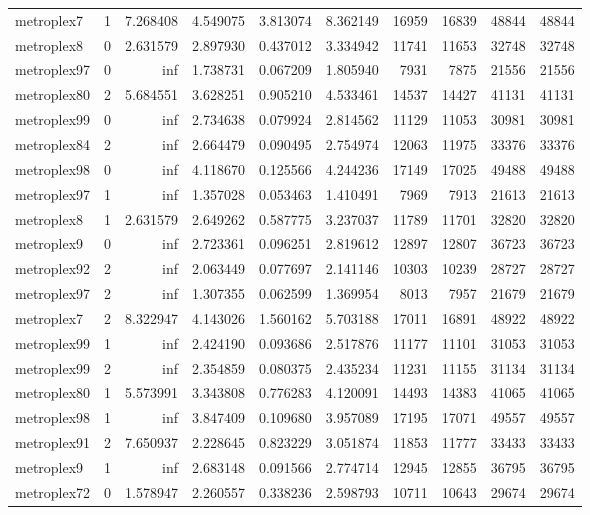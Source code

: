 \begin{longtable}{|l|r|r|r|r|r|r|r|r|r|}
metroplex7 & 1 & 7.268408 & 4.549075 & 3.813074 & 8.362149 & 16959 & 16839 & 48844 & 48844 \\
metroplex8 & 0 & 2.631579 & 2.897930 & 0.437012 & 3.334942 & 11741 & 11653 & 32748 & 32748 \\
metroplex97 & 0 & inf & 1.738731 & 0.067209 & 1.805940 & 7931 & 7875 & 21556 & 21556 \\
metroplex80 & 2 & 5.684551 & 3.628251 & 0.905210 & 4.533461 & 14537 & 14427 & 41131 & 41131 \\
metroplex99 & 0 & inf & 2.734638 & 0.079924 & 2.814562 & 11129 & 11053 & 30981 & 30981 \\
metroplex84 & 2 & inf & 2.664479 & 0.090495 & 2.754974 & 12063 & 11975 & 33376 & 33376 \\
metroplex98 & 0 & inf & 4.118670 & 0.125566 & 4.244236 & 17149 & 17025 & 49488 & 49488 \\
metroplex97 & 1 & inf & 1.357028 & 0.053463 & 1.410491 & 7969 & 7913 & 21613 & 21613 \\
metroplex8 & 1 & 2.631579 & 2.649262 & 0.587775 & 3.237037 & 11789 & 11701 & 32820 & 32820 \\
metroplex9 & 0 & inf & 2.723361 & 0.096251 & 2.819612 & 12897 & 12807 & 36723 & 36723 \\
metroplex92 & 2 & inf & 2.063449 & 0.077697 & 2.141146 & 10303 & 10239 & 28727 & 28727 \\
metroplex97 & 2 & inf & 1.307355 & 0.062599 & 1.369954 & 8013 & 7957 & 21679 & 21679 \\
metroplex7 & 2 & 8.322947 & 4.143026 & 1.560162 & 5.703188 & 17011 & 16891 & 48922 & 48922 \\
metroplex99 & 1 & inf & 2.424190 & 0.093686 & 2.517876 & 11177 & 11101 & 31053 & 31053 \\
metroplex99 & 2 & inf & 2.354859 & 0.080375 & 2.435234 & 11231 & 11155 & 31134 & 31134 \\
metroplex80 & 1 & 5.573991 & 3.343808 & 0.776283 & 4.120091 & 14493 & 14383 & 41065 & 41065 \\
metroplex98 & 1 & inf & 3.847409 & 0.109680 & 3.957089 & 17195 & 17071 & 49557 & 49557 \\
metroplex91 & 2 & 7.650937 & 2.228645 & 0.823229 & 3.051874 & 11853 & 11777 & 33433 & 33433 \\
metroplex9 & 1 & inf & 2.683148 & 0.091566 & 2.774714 & 12945 & 12855 & 36795 & 36795 \\
metroplex72 & 0 & 1.578947 & 2.260557 & 0.338236 & 2.598793 & 10711 & 10643 & 29674 & 29674 \\

\end{longtable}
